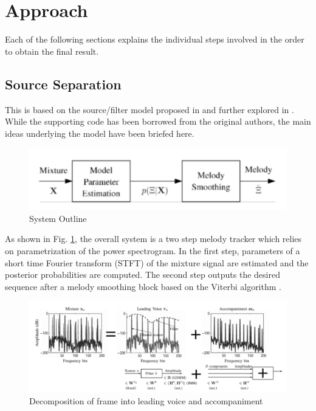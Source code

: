 \documentclass[12pt,journal,compsoc]{IEEEtran}
\begin{document}
\section{Approach}

Each of the following sections explains the individual steps involved in the order to obtain the final result.

\subsection{Source Separation}

This is based on the source/filter model proposed in \cite{durrieu01} and further explored in \cite{durrieu02}. While the supporting code has been borrowed from the original authors, the main ideas underlying the model have been briefed here.

\begin{figure}[H]
\includegraphics[scale=0.2]{images/fig1}
    \caption{System Outline}
    \label{fig:fig1}
\end{figure}

As shown in Fig. \ref{fig:fig1}, the overall system is a two step melody tracker which relies on parametrization of the power spectrogram. In the first step, parameters of a short time Fourier transform (STFT) of the mixture signal are estimated and the posterior probabilities are computed. The second step outputs the desired sequence after a melody smoothing block based on the Viterbi algorithm \cite{viterbi}.

\begin{figure}[H]
\includegraphics[scale=0.12]{images/fig2}
    \caption{Decomposition of frame into leading voice and accompaniment}
    \label{fig:fig2}
\end{figure}
\end{document}

